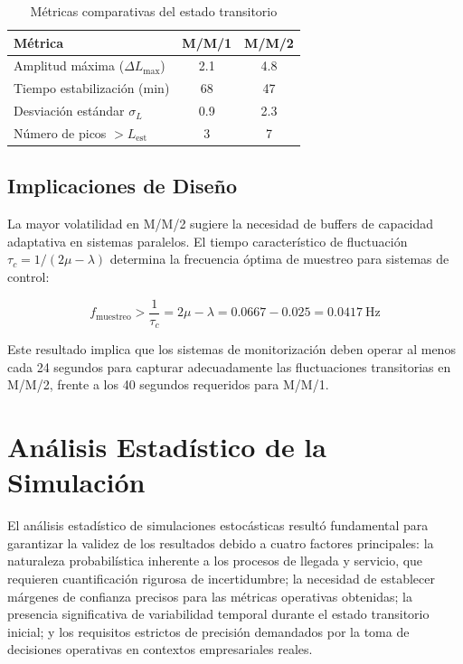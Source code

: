 \documentclass[12pt, a4paper]{article}
\begin{document}
    \begin{table}[h]
    	\centering
    	\caption{Métricas comparativas del estado transitorio}
    	\label{tab:metricas-transitorio}
    	\begin{tabular}{lcc}
    		\toprule
    		\textbf{Métrica} & \textbf{M/M/1} & \textbf{M/M/2} \\
    		\midrule
    		Amplitud máxima ($\Delta L_{\text{max}}$) & 2.1 & 4.8 \\
    		Tiempo estabilización (min) & 68 & 47 \\
    		Desviación estándar $\sigma_L$ & 0.9 & 2.3 \\
    		Número de picos $> L_{\text{est}}$ & 3 & 7 \\
    		\bottomrule
    	\end{tabular}
    \end{table}
    
    \subsection{Implicaciones de Diseño}
    La mayor volatilidad en M/M/2 sugiere la necesidad de buffers de capacidad adaptativa en sistemas paralelos. El tiempo característico de fluctuación $\tau_c = 1/(2\mu - \lambda)$ determina la frecuencia óptima de muestreo para sistemas de control:
    
    \begin{equation}
    	f_{\text{muestreo}} > \frac{1}{\tau_c} = 2\mu - \lambda = 0.0667 - 0.025 = 0.0417\ \text{Hz}
    \end{equation}
    
    Este resultado implica que los sistemas de monitorización deben operar al menos cada 24 segundos para capturar adecuadamente las fluctuaciones transitorias en M/M/2, frente a los 40 segundos requeridos para M/M/1.
    
    \section{Análisis Estadístico de la Simulación}
    \label{sec:analisis-estadistico}
    

    El análisis estadístico de simulaciones estocásticas resultó fundamental para garantizar la validez de los resultados debido a cuatro factores principales: la naturaleza probabilística inherente a los procesos de llegada y servicio, que requieren cuantificación rigurosa de incertidumbre; la necesidad de establecer márgenes de confianza precisos para las métricas operativas obtenidas; la presencia significativa de variabilidad temporal durante el estado transitorio inicial; y los requisitos estrictos de precisión demandados por la toma de decisiones operativas en contextos empresariales reales.
    
\end{document}
